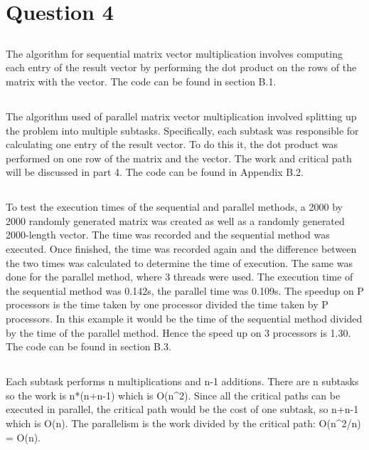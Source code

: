 \documentclass[11pt]{article}
\begin{document}
\section{Question 4}

\subsection{}
The algorithm for sequential matrix vector multiplication involves computing each entry of the result vector by performing the dot 
product on the rows of the matrix with the vector. The code can be found in section B.1.

\subsection{}
The algorithm used of parallel matrix vector multiplication involved splitting up the problem into multiple subtasks. Specifically, each 
subtask was responsible for calculating one entry of the result vector. To do this it, the dot product was performed on one row of the 
matrix and the vector. The work and critical path will be discussed in part 4. The code can be found in Appendix B.2.

\subsection{}
To test the execution times of the sequential and parallel methods, a 2000 by 2000 randomly generated matrix was created as well as a 
randomly generated 2000-length vector. The time was recorded and the sequential method was executed. Once finished, the time was 
recorded again and the difference between the two times was calculated to determine the time of execution. The same was done for the 
parallel method, where 3 threads were used. The execution time of the sequential method was 0.142s, the parallel time was 0.109s. The 
speedup on P processors is the time taken by one processor divided the time taken by P processors. In this example it would be the time 
of the sequential method divided by the time of the parallel method. Hence the speed up on 3 processors is 1.30. The code can be found 
in section B.3.

\subsection{}
Each subtask performs n multiplications and n-1 additions. There are n subtasks so the work is n*(n+n-1) which is O(n^2). Since all 
the critical paths can be executed in parallel, the critical path would be the cost of one subtask, so n+n-1 which is O(n). The 
parallelism is the work divided by the critical path: O(n^2/n) = O(n).
\end{document}
